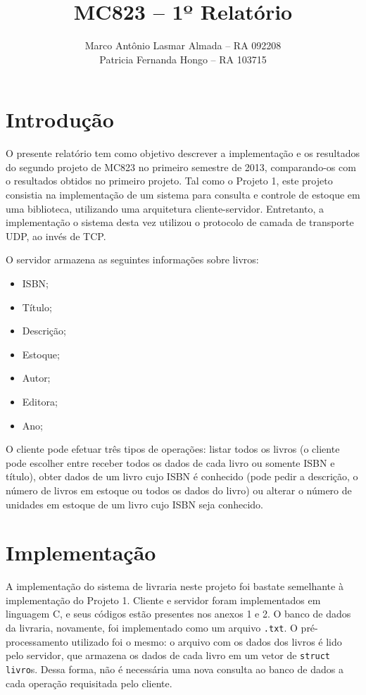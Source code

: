 \documentclass[11pt, brazil]{article} %
\title{MC823 -- 1º Relatório}
\author{Marco Antônio Lasmar Almada -- RA 092208 \\ Patricia Fernanda Hongo -- RA 103715}
\date{} %
\begin{document}
\maketitle

\section{Introdução}

O presente relatório tem como objetivo descrever a implementação e os resultados do segundo projeto de MC823 no primeiro semestre de 2013, comparando-os com o resultados obtidos no primeiro projeto. Tal como o Projeto 1, este projeto consistia na implementação de um sistema para consulta e controle de estoque em uma biblioteca, utilizando uma arquitetura cliente-servidor. Entretanto, a implementação o sistema desta vez utilizou o protocolo de camada de transporte UDP, ao invés de TCP.

O servidor armazena as seguintes informações sobre livros:
\begin{itemize}
  \item ISBN;
  \item Título;
  \item Descrição;
  \item Estoque;
  \item Autor;
  \item Editora;
  \item Ano;  
\end{itemize}

O cliente pode efetuar três tipos de operações: listar todos os livros (o cliente pode escolher entre receber todos os dados de cada livro ou somente ISBN e título), obter dados de um livro cujo ISBN é conhecido (pode pedir a descrição, o número de livros em estoque ou todos os dados do livro) ou alterar o número de unidades em estoque de um livro cujo ISBN seja conhecido.

\section{Implementação}

A implementação do sistema de livraria neste projeto foi bastate semelhante à implementação do Projeto 1.
Cliente e servidor foram implementados em linguagem C, e seus códigos estão presentes nos anexos 1 e 2. O banco de dados da livraria, novamente, foi implementado como um arquivo \texttt{.txt}. O pré-processamento utilizado foi o mesmo: o arquivo com os dados dos livros é lido pelo servidor, que armazena os dados de cada livro em um vetor de \texttt{struct livro}s. Dessa forma, não é necessária uma nova consulta ao banco de dados a cada operação requisitada pelo cliente.
\end{document}
